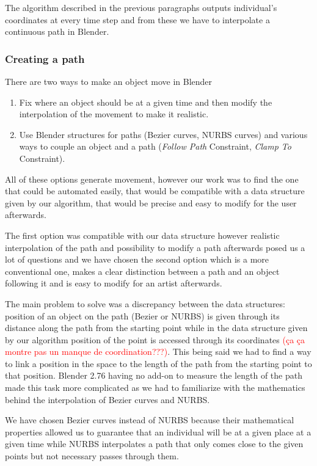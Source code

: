 The algorithm described in the previous paragraphs outputs
individual's coordinates at every time step and from these we have to
interpolate a continuous path in Blender.


\subsubsection{Creating a path}

There are two ways to make an object move in Blender
\begin{enumerate}
\item Fix where an object should be at a given time and then modify
the interpolation of the movement to make it realistic.
\item Use Blender structures for paths (Bezier curves, NURBS curves)
and various ways to couple an object and a path (\textit{Follow Path}
Constraint, \textit{Clamp To} Constraint).
\end{enumerate}

All of these options generate movement, however our work was to find
the one that could be automated easily, that would be compatible with
a data structure given by our algorithm, that would be precise and
easy to modify for the user afterwards.

The first option was compatible with our data structure however
realistic interpolation of the path and possibility to modify a path
afterwards posed us a lot of questions and we have chosen the second
option which is a more conventional one, makes a clear distinction
between a path and an object following it and is easy to modify for an
artist afterwards.

The main problem to solve was a discrepancy between the data
structures: position of an object on the path (Bezier or NURBS) is
given through its distance along the path from the starting point
while in the data structure given by our algorithm position of the
point is accessed through its coordinates \textcolor{red}{(ça ça
montre pas un manque de coordination???)}. This being said we
had to find a way to link a position in the space to the length of the
path from the starting point to that position. Blender 2.76 having no
add-on to measure the length of the path made this task more
complicated as we had to familiarize with the mathematics behind the
interpolation of Bezier curves and NURBS.

We have chosen Bezier curves instead of NURBS because their
mathematical properties allowed us to guarantee that an individual
will be at a given place at a given time while NURBS interpolates a
path that only comes close to the given points but not necessary
passes through them.

